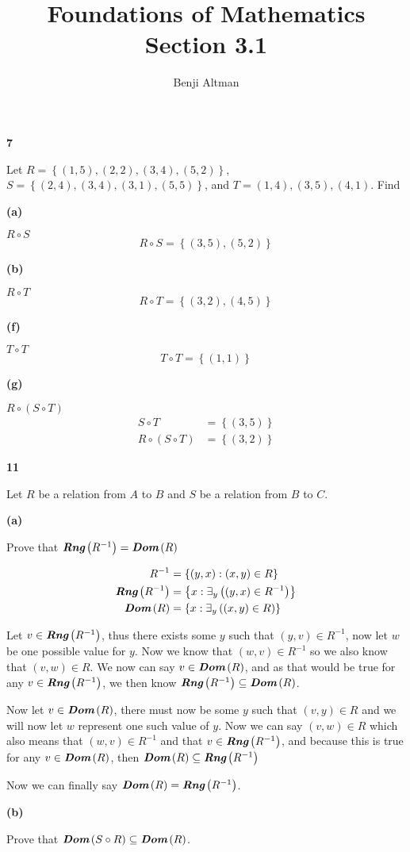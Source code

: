 \documentclass{article}
\title{Foundations of Mathematics \\ Section 3.1}
\author{Benji Altman}
\newcommand{\sectionheading}[1]{\noindent\textbf{#1}

}
\let\composed\circ
\newcommand{\set}[1]{\left\{ {#1} \right\}}
\newcommand{\setbuilder}[2]{\set{#1 : #2}}
\newcommand{\Exists}[2]{\exists_{#1}\left( {#2} \right)}
\newcommand{\range}[1]{\textit{\textbf{Rng}}\left( #1 \right)}
\newcommand{\domain}[1]{\textit{\textbf{Dom}}\left( #1 \right)}
\newcommand{\pair}[2]{\left( #1 , #2 \right)}
\begin{document}
\maketitle

\sectionheading{7}
Let $R=\set{\pair15,\pair22,(3,4),(5,2)}$, $S=\set{(2,4),(3,4),(3,1),(5,5)}$, and $T={(1,4),(3,5),(4,1)}$. Find

\smallskip
\sectionheading{(a)}
$R\composed S$
\[R\composed S = \set{(3,5),(5,2)}\]

\medskip
\sectionheading{(b)}
$R \composed T$
\[R\composed T = \set{(3,2),(4,5)}\]

\medskip
\sectionheading{(f)}
$T \composed T$
\[T\composed T = \set{(1,1)}\]

\medskip
\sectionheading{(g)}
$R \composed (S \composed T)$
\begin{align*}
S \composed T &= \set{(3,5)} \\
R\composed (S \composed T) &= \set{(3,2)}
\end{align*}

\bigskip
\sectionheading{11}
Let $R$ be a relation from $A$ to $B$ and $S$ be a relation from $B$ to $C$.

\smallskip
\sectionheading{(a)}
Prove that $\range{R^{-1}}=\domain{R}$

\begin{align*}
R^{-1} &= \setbuilder{(y,x)}{(x,y) \in R} \\
\range{R^{-1}} &= \setbuilder{x}{\Exists{y}{(y,x) \in R^{-1}}} \\
\domain{R} &= \setbuilder{x}{\Exists{y}{(x,y) \in R}}
\end{align*}

Let $v\in\range{R^{-1}}$, thus there exists some $y$ such that $(y,v) \in R^{-1}$, now let $w$ be one possible value for $y$. Now we know that $(w,v) \in R^{-1}$ so we also know that $(v,w) \in R$. We now can say $v \in \domain R$, and as that would be true for any $v\in\range{R^{-1}}$, we then know $\range{R^{-1}} \subseteq \domain R$.

Now let $v\in\domain R$, there must now be some $y$ such that $(v,y) \in R$ and we will now let $w$ represent one such value of $y$. Now we can say $(v,w) \in R$ which also means that $(w,v) \in R^{-1}$ and that $v \in \range{R^{-1}}$, and because this is true for any $v\in\domain R$, then $\domain R \subseteq \range{R^{-1}}$

Now we can finally say $\domain R = \range{R^{-1}}$.

\medskip
\sectionheading{(b)}
Prove that $\domain{S \composed R} \subseteq \domain R$.
\end{document}
